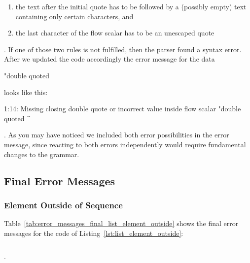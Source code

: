 \begin{enumerate}
  \item the text after the initial quote has to be followed by a (possibly empty) text containing only certain characters, and
  \item the last character of the flow scalar has to be an unescaped quote
\end{enumerate}

. If one of those two rules is not fulfilled, then the parser found a syntax error. After we updated the code accordingly the error message for the  data

\begin{yamlcode}
  "double quoted
\end{yamlcode}

looks like this:

\begin{textcode}
  1:14: Missing closing double quote or
        incorrect value inside flow scalar
        "double quoted
                      ^
\end{textcode}

. As you may have noticed we included both error possibilities in the error message, since reacting to both errors independently would require fundamental changes to the grammar.

\subsection{Final Error Messages}

\subsubsection{Element Outside of Sequence}

Table~\ref{tab:error_messages_final_list_element_outside} shows the final error messages for the code of Listing~\ref{lst:list_element_outside}:

\begin{code-boxed}
  \inputminted[linenos]{yaml}{Data/Errors/list_element_outside.yaml}
\end{code-boxed}

.

